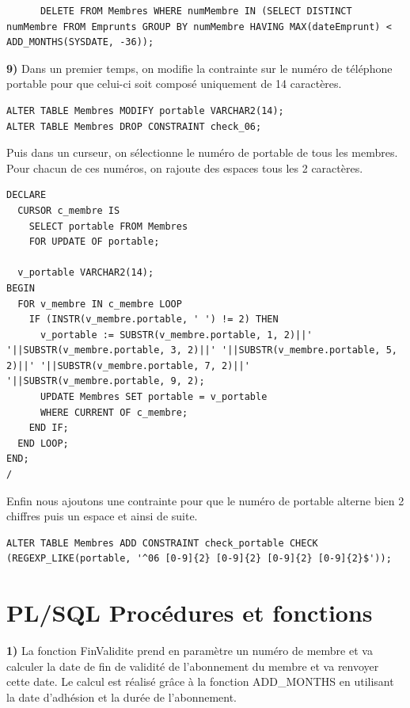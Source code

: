 \documentclass[a4paper,12pt]{article}
\begin{document}
      \begin{lstlisting}
      DELETE FROM Membres WHERE numMembre IN (SELECT DISTINCT numMembre FROM Emprunts GROUP BY numMembre HAVING MAX(dateEmprunt) < ADD_MONTHS(SYSDATE, -36));

      \end{lstlisting}

\textbf {9)} Dans un premier temps, on modifie la contrainte sur le numéro de téléphone portable pour que celui-ci soit composé uniquement de 14 caractères.
      \begin{lstlisting}
ALTER TABLE Membres MODIFY portable VARCHAR2(14);
ALTER TABLE Membres DROP CONSTRAINT check_06;
\end{lstlisting}
	Puis dans un curseur, on sélectionne le numéro de portable de tous les membres. Pour chacun de ces numéros, on rajoute des espaces tous les 2 caractères. 

      \begin{lstlisting}
DECLARE
  CURSOR c_membre IS
    SELECT portable FROM Membres
    FOR UPDATE OF portable;

  v_portable VARCHAR2(14);
BEGIN
  FOR v_membre IN c_membre LOOP
    IF (INSTR(v_membre.portable, ' ') != 2) THEN
      v_portable := SUBSTR(v_membre.portable, 1, 2)||' '||SUBSTR(v_membre.portable, 3, 2)||' '||SUBSTR(v_membre.portable, 5, 2)||' '||SUBSTR(v_membre.portable, 7, 2)||' '||SUBSTR(v_membre.portable, 9, 2);
      UPDATE Membres SET portable = v_portable
      WHERE CURRENT OF c_membre;
    END IF;
  END LOOP;
END;
/
      \end{lstlisting}

Enfin nous ajoutons une contrainte pour que le numéro de portable alterne bien 2 chiffres puis un espace et ainsi de suite.      

      \begin{lstlisting}
ALTER TABLE Membres ADD CONSTRAINT check_portable CHECK (REGEXP_LIKE(portable, '^06 [0-9]{2} [0-9]{2} [0-9]{2} [0-9]{2}$')); 
      \end{lstlisting}
      

      \section{PL/SQL Procédures et fonctions}
           \textbf {1)} La fonction FinValidite prend en paramètre un numéro de membre et va calculer la date de fin de validité de l'abonnement du membre et va renvoyer cette date. Le calcul est réalisé grâce à la fonction ADD\_MONTHS en utilisant la date d'adhésion et la durée de l'abonnement.
           
\end{document}
